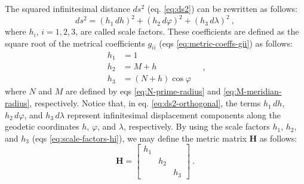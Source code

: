 \documentclass[mreferee]{gji}
\begin{document}
The squared infinitesimal distance $ds^{2}$ (eq. \ref{eq:ds2})
can be rewritten as follows:
\begin{equation} \label{eq:ds2-orthogonal}
ds^{2} = \left( h_{1} \, dh \right)^{2} + 
\left( h_{2} \, d\varphi \right)^{2} + \left( h_{3} \, d\lambda \right)^{2} \: ,
\end{equation}
where $h_{i}$, $i = 1, 2, 3$, are called scale factors.
These coefficients are defined as the square root of the metrical coefficients
$g_{ii}$ (eqs \ref{eq:metric-coeffs-gii}) as follows:
\begin{equation} \label{eq:scale-factors-hi}
\begin{split}
h_{1} &= 1 \\
h_{2} &= M + h \\
h_{3} &= \left( N + h \right) \cos\varphi
\end{split} \quad ,
\end{equation}
where $N$ and $M$ are defined by eqs \ref{eq:N-prime-radius} and
\ref{eq:M-meridian-radius}, respectively.
Notice that, in eq. \ref{eq:ds2-orthogonal}, the terms
$h_{1} \, dh$, $h_{2} \, d\varphi$, and $h_{3} \, d\lambda$
represent infinitesimal displacement components along the geodetic
coordinates $h$, $\varphi$, and $\lambda$, respectively.
By using the scale factors $h_{1}$, $h_{2}$, and $h_{3}$ (eqs \ref{eq:scale-factors-hi}),
we may define the metric matrix $\mathbf{H}$ \citep{soler1976} as follows:
\begin{equation} \label{eq:H-metric-matrix}
\mathbf{H} = \begin{bmatrix}
h_{1} & & \\
& h_{2} & \\
& & h_{3}
\end{bmatrix} \: .
\end{equation}
\end{document}
